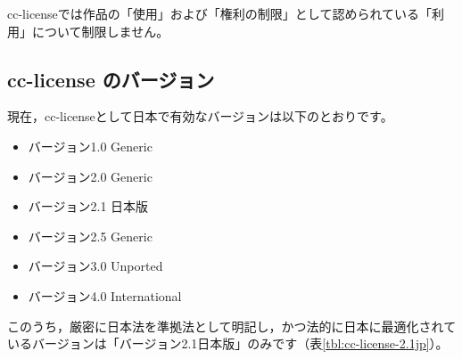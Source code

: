 \documentclass{ltjsarticle}
\begin{document}
cc-licenseでは作品の「使用」および「権利の制限」として認められている「利用」について制限しません。


\subsection{cc-license のバージョン}

現在，cc-licenseとして日本で有効なバージョンは以下のとおりです。
\begin{itemize}
\item バージョン1.0 Generic
\item バージョン2.0 Generic
\item バージョン2.1 日本版
\item バージョン2.5 Generic
\item バージョン3.0 Unported
\item バージョン4.0 International
\end{itemize}
このうち，厳密に日本法を準拠法として明記し，かつ法的に日本に最適化されているバージョンは「バージョン2.1日本版」のみです（表\ref{tbl:cc-license-2.1jp}）。
\end{document}
